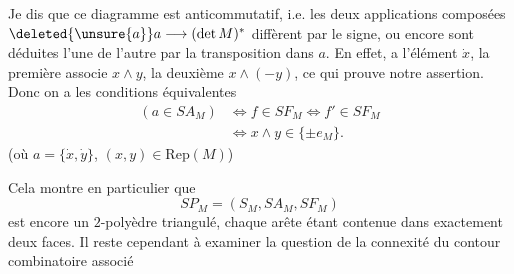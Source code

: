 Je dis que ce diagramme est anticommutatif, i.e. les deux applications composées $\deleted{\unsure{a}}a\longrightarrow(\det M)^*$ diffèrent par le signe, ou encore sont déduites l'une de l'autre par la transposition dans $a$. En effet, a l'élément $\dot x$, la première associe $x\wedge y$, la deuxième $x\wedge(-y)$, ce qui prouve notre assertion. Donc on a les conditions équivalentes
\[
\begin{aligned}
(a\in SA_M)&\iff f\in SF_M\iff f'\in SF_M\\
&\iff x\wedge y\in\{\pm e_M\}.
\end{aligned}\tag*{(34)}
\]
(où $a=\{\dot x,\dot y\}$, $(x,y)\in\mathrm{Rep}(M)$)

Cela montre en particulier que
\[
SP_M=(S_M,SA_M,SF_M)\tag*{(35)}
\]
est encore un $2$-polyèdre triangulé, chaque arête étant contenue dans exactement deux faces. Il reste cependant à examiner la question de la connexité du contour combinatoire  associé
